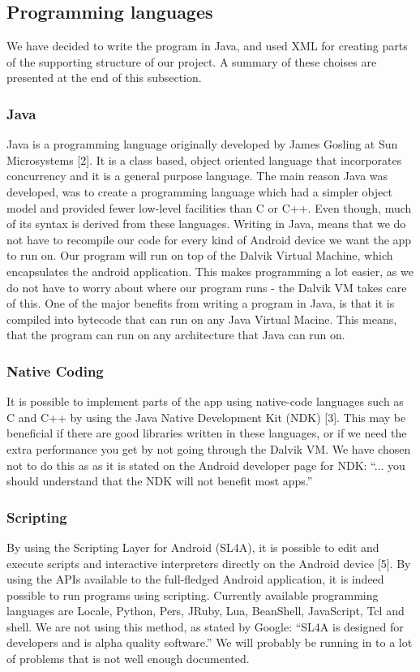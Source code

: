 
\subsection{Programming languages}
We have decided to write the program in Java, and used XML for creating parts of the supporting structure of our project. A summary of these choises are presented at the end of this subsection.

\subsubsection{Java}
Java is a programming language originally developed by James Gosling at Sun Microsystems [2]. It is a class based, object oriented language that incorporates concurrency and it is a general purpose language. The main reason Java was developed, was to create a programming language which had a simpler object model and provided fewer low-level facilities than C or C++. Even though, much of its syntax is derived from these languages.
\newline
\newline
Writing in Java, means that we do not have to recompile our code for every kind of Android device we want the app to run on. Our program will run on top of the Dalvik Virtual Machine, which encapsulates the android application. This makes programming a lot easier, as we do not have to worry about where our program runs - the Dalvik VM takes care of this.
\newline
\newline
One of the major benefits from writing a program in Java, is that it is compiled into bytecode that can run on any Java Virtual Macine. This means, that the program can run on any architecture that Java can run on.

\subsubsection{Native Coding}
It is possible to implement parts of the app using native-code languages such as C and C++ by using the Java Native Development Kit (NDK) [3]. This may be beneficial if there are good libraries written in these languages, or if we need the extra performance you get by not going through the Dalvik VM. We have chosen not to do this as as it is stated on the Android developer page for NDK: “... you should understand that the NDK will not benefit most apps.”

\subsubsection{Scripting}
By using the Scripting Layer for Android (SL4A), it is possible to edit and execute scripts and interactive interpreters directly on the Android device [5]. By using the APIs available to the full-fledged Android application, it is indeed possible to run programs using scripting. Currently available programming languages are Locale, Python, Pers, JRuby, Lua, BeanShell, JavaScript, Tcl and shell. We are not using this method, as stated by Google: “SL4A is designed for developers and is alpha quality software.” We will probably be running in to a lot of problems that is not well enough documented.

